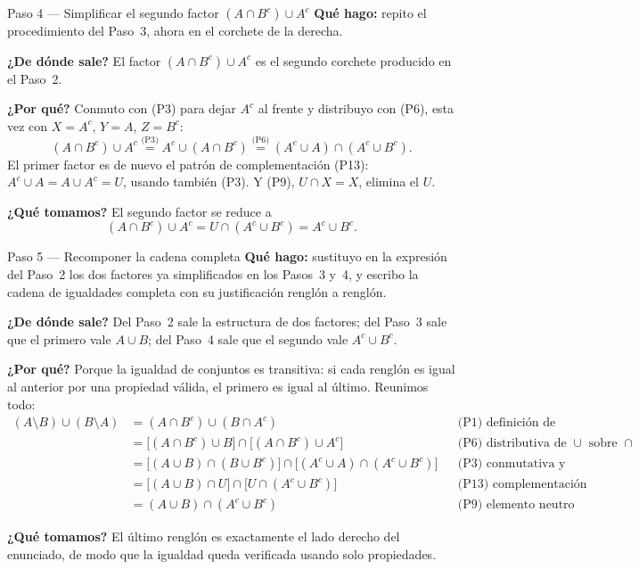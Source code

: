 \documentclass[11pt]{article}
\begin{document}
\begin{paso}{Paso 4 --- Simplificar el segundo factor $(A\cap B^{c})\cup A^{c}$}
\textbf{Qué hago:} repito el procedimiento del Paso~3, ahora en el corchete de la derecha.

\textbf{¿De dónde sale?} El factor $(A\cap B^{c})\cup A^{c}$ es el segundo corchete producido en
el Paso~2.

\textbf{¿Por qué?} Conmuto con (P3) para dejar $A^{c}$ al frente y distribuyo con (P6), esta vez
con $X=A^{c}$, $Y=A$, $Z=B^{c}$:
\[
(A\cap B^{c})\cup A^{c} \overset{\text{(P3)}}{=} A^{c}\cup(A\cap B^{c})
\overset{\text{(P6)}}{=} (A^{c}\cup A)\cap(A^{c}\cup B^{c}).
\]
El primer factor es de nuevo el patrón de complementación (P13): $A^{c}\cup A=A\cup A^{c}=U$,
usando también (P3). Y (P9), $U\cap X=X$, elimina el $U$.

\textbf{¿Qué tomamos?} El segundo factor se reduce a
\[
(A\cap B^{c})\cup A^{c}=U\cap(A^{c}\cup B^{c})=A^{c}\cup B^{c}.
\]
\end{paso}

\begin{paso}{Paso 5 --- Recomponer la cadena completa}
\textbf{Qué hago:} sustituyo en la expresión del Paso~2 los dos factores ya simplificados en los
Pasos~3 y~4, y escribo la cadena de igualdades completa con su justificación renglón a renglón.

\textbf{¿De dónde sale?} Del Paso~2 sale la estructura de dos factores; del Paso~3 sale que el
primero vale $A\cup B$; del Paso~4 sale que el segundo vale $A^{c}\cup B^{c}$.

\textbf{¿Por qué?} Porque la igualdad de conjuntos es transitiva: si cada renglón es igual al
anterior por una propiedad válida, el primero es igual al último. Reunimos todo:
\begin{align*}
(A\setminus B)\cup(B\setminus A)
&=(A\cap B^{c})\cup(B\cap A^{c}) && \text{(P1) definición de diferencia, dos veces}\\
&=\bigl[(A\cap B^{c})\cup B\bigr]\cap\bigl[(A\cap B^{c})\cup A^{c}\bigr] && \text{(P6) distributiva de }\cup\text{ sobre }\cap\\
&=\bigl[(A\cup B)\cap(B\cup B^{c})\bigr]\cap\bigl[(A^{c}\cup A)\cap(A^{c}\cup B^{c})\bigr] && \text{(P3) conmutativa y (P6) otra vez}\\
&=\bigl[(A\cup B)\cap U\bigr]\cap\bigl[U\cap(A^{c}\cup B^{c})\bigr] && \text{(P13) complementación}\\
&=(A\cup B)\cap(A^{c}\cup B^{c}) && \text{(P9) elemento neutro}
\end{align*}

\textbf{¿Qué tomamos?} El último renglón es exactamente el lado derecho del enunciado, de modo
que la igualdad queda verificada usando solo propiedades.
\end{paso}
\end{document}
